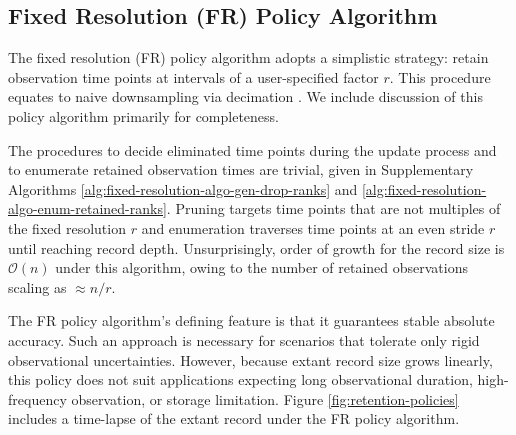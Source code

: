 \subsection{Fixed Resolution (FR) Policy Algorithm}
\label{sec:fixed-resolution-algo}

The fixed resolution (FR) policy algorithm adopts a simplistic strategy: retain observation time points at intervals of a user-specified factor $r$.
This procedure equates to naive downsampling via decimation \citep[p. 31]{crochiere1983multirate}.
We include discussion of this policy algorithm primarily for completeness.

The procedures to decide eliminated time points during the update process and to enumerate retained observation times are trivial, given in Supplementary Algorithms \ref{alg:fixed-resolution-algo-gen-drop-ranks} and \ref{alg:fixed-resolution-algo-enum-retained-ranks}.
Pruning targets time points that are not multiples of the fixed resolution $r$ and enumeration traverses time points at an even stride $r$ until reaching record depth.
Unsurprisingly, order of growth for the record size is $\mathcal{O}(n)$ under this algorithm, owing to the number of retained observations scaling as $\approx n / r$.




% 
% 

The FR policy algorithm's defining feature is that it guarantees stable absolute accuracy.
Such an approach is necessary for scenarios that tolerate only rigid observational uncertainties.
However, because extant record size grows linearly, this policy does not suit applications expecting long observational duration, high-frequency observation, or storage limitation.
Figure \ref{fig:retention-policies} includes a time-lapse of the extant record under the FR policy algorithm.

% 
% 
